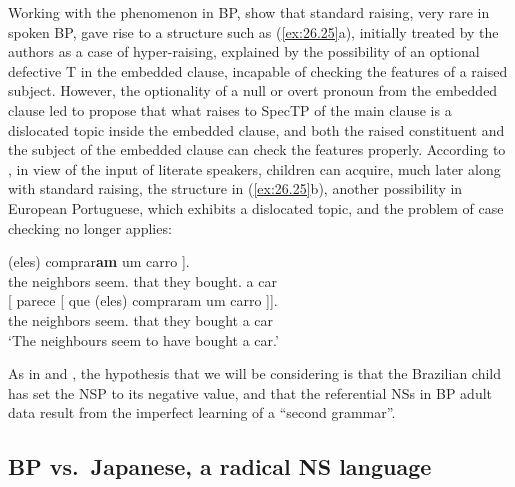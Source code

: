 \documentclass[output=paper]{langsci/langscibook}
\begin{document}
Working with the  phenomenon in \gls{BP},
\citet{MartinsNunes2005} show that standard raising, very rare in spoken
\gls{BP}, gave rise to a structure such as (\ref{ex:26.25}a), initially
treated by the authors as a case of hyper-raising, explained by the possibility
of an optional defective T in the embedded clause, incapable of checking the
features of a raised subject. However, the optionality of a null or overt
pronoun from the embedded clause led \textcite{MartinsNunes2010} to propose
that what raises to SpecTP of the main clause is a dislocated topic inside
the embedded clause, and both the raised constituent and the subject of the
embedded clause can check the features properly. According to
\citeauthor{MartinsNunes2010}, in view of the input of literate speakers,
children can acquire, much later along with standard raising, the structure in
(\ref{ex:26.25}b), another possibility in European Portuguese, which exhibits a
dislocated topic, and the problem of case checking no longer applies:

\ea%
    \label{ex:26.25}
    \ea
    \gll	[\tss{CP}~[ Os vizinhos {]\tss{i}} parec\textbf{em} [ que [~\emph{t}~] (eles) comprar\textbf{am} um carro ].\\
            {} the neighbors {} seem.\Tpl{} {} that {} \hphantom{(}they bought.\Tpl{}  a car\\
    \ex
    \gll	[\tss{TopP}~[ Os vizinhos ] [ parece [ que (eles) compraram um carro ]].\\
            {} the neighbors {} {} seem.\Tsg{} {} that \hphantom{(}they bought a car\\
	\glt	\enquote*{The neighbours seem to have bought a car.}
    \z
\z

As in \citet{MartinsNunes2010} and \citet{Kato2011}, the hypothesis that we
will be considering is that the Brazilian child has set the \gls{NSP} to its
negative value, and that the referential NSs in \gls{BP} adult data result from the imperfect learning of a “second
grammar”.

\subsection{BP vs.\ Japanese, a radical NS language}\label{sec:26.3.2}\largerpage
\end{document}
